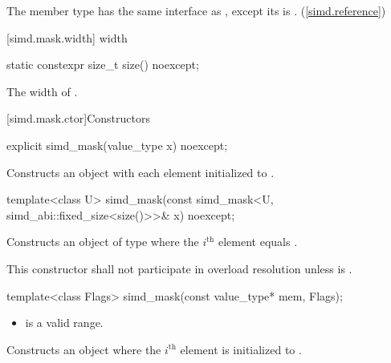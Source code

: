 \begin{wgText}
\pnum
The member type  has the same interface as , except its  is . (\ref{simd.reference})

[simd.mask.width]{ width}

\begin{itemdecl}
static constexpr size_t size() noexcept;
\end{itemdecl}

\begin{itemdescr}
  \pnum\returns
  The width of .
\end{itemdescr}

[simd.mask.ctor]{Constructors}

\begin{itemdecl}
explicit simd_mask(value_type x) noexcept;
\end{itemdecl}

\begin{itemdescr}
  \pnum\effects
  Constructs an object with each element initialized to .
\end{itemdescr}

\begin{itemdecl}
template<class U> simd_mask(const simd_mask<U, simd_abi::fixed_size<size()>>& x) noexcept;
\end{itemdecl}

\begin{itemdescr}
  \pnum\effects
  Constructs an object of type  where the $i^\text{th}$ element equals  \foralli.

  \pnum\remarks
  This constructor shall not participate in overload resolution unless  is .
\end{itemdescr}

\begin{itemdecl}
template<class Flags> simd_mask(const value_type* mem, Flags);
\end{itemdecl}

\begin{itemdescr}
  \pnum\requires
  \begin{itemize}
    \item \tcode{[mem, mem + size())} is a valid range.
  \end{itemize}

  \pnum\effects
  Constructs an object where the $i^\text{th}$ element is initialized to  \foralli.


\end{itemdescr}
\end{wgText}

